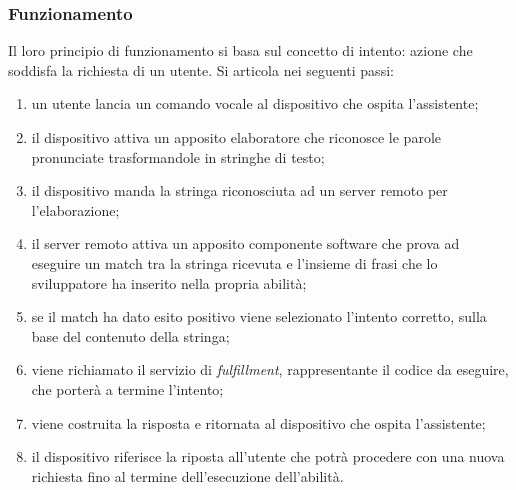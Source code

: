 		\subsubsection{Funzionamento}
		Il loro principio di funzionamento si basa sul concetto di intento: azione che soddisfa la richiesta di un utente. Si articola nei seguenti passi:
		\begin{enumerate}
			\item un utente lancia un comando vocale al dispositivo che ospita l'assistente;
			\item il dispositivo attiva un apposito elaboratore che riconosce le parole pronunciate trasformandole in stringhe di testo;
			\item il dispositivo manda la stringa riconosciuta ad un server remoto per l'elaborazione;
			\item il server remoto attiva un apposito componente software che prova ad eseguire un match tra la stringa ricevuta e l'insieme di frasi che lo sviluppatore ha inserito nella propria abilità;
			\item se il match ha dato esito positivo viene selezionato l'intento corretto, sulla base del contenuto della stringa;
			\item viene richiamato il servizio di \textit{fulfillment}, rappresentante il codice da eseguire, che porterà a termine l'intento;
			\item viene costruita la risposta e ritornata al dispositivo che ospita l'assistente;
			\item il dispositivo riferisce la riposta all'utente che potrà procedere con una nuova richiesta fino al termine dell'esecuzione dell'abilità.
		\end{enumerate}
